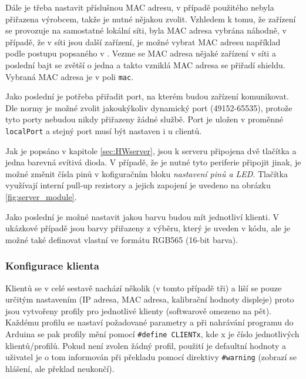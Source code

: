 Dále je třeba nastavit příslušnou MAC adresu, v případě použitého nebyla přiřazena výrobcem, takže je nutné nějakou zvolit. Vzhledem k tomu, že zařízení se provozuje na samostatné lokální síti, byla MAC adresa vybrána náhodně, v případě, že v síti jsou další zařízení, je možné vybrat MAC adresu například podle postupu popsaného v \cite{vyberMAC}. Vezme se MAC adresa nějaké zařízení v síti a poslední bajt se zvětší o jedna a takto vzniklá MAC adresa se přiřadí shieldu.
Vybraná MAC adresa je v poli \texttt{mac}.

Jako poslední je potřeba přiřadit port, na kterém budou zařízení komunikovat. Dle normy \cite{norm_RFC6335} je možné zvolit jakoukýkoliv dynamický port (49152-65535), protože tyto porty nebudou nikdy přiřazeny žádné službě. Port je uložen v proměnné \texttt{localPort} a stejný port musí být nastaven i u clientů.


Jak je popsáno v kapitole \ref{sec:HWserver}, jsou k serveru připojena dvě tlačítka a jedna barevná svítivá dioda. V případě, že je nutné tyto periferie připojit jinak, je možné změnit čísla pinů v kofiguračním bloku \textit{nastavení pinů a LED}. Tlačítka využívají interní pull-up rezistory a jejich zapojení je uvedeno na obrázku \ref{fig:server_module}.


Jako poslední je možné nastavit jakou barvu budou mít jednotliví klienti. V ukázkové případě jsou barvy přiřazeny z výběru, který je uveden v kódu, ale je možné také definovat vlastní ve formátu RGB565 (16-bit barva).


\subsubsection{Konfigurace klienta}
\label{sec:client-nastaveni}
Klientů se v celé sestavě nachází několik (v tomto případě tři) a liší se pouze určitým nastavením (IP adresa, MAC adresa, kalibrační hodnoty displeje) proto jsou vytvořeny profily pro jednotlivé klienty (softwarově omezeno na pět). Každému profilu se nastaví požadované parametry a při nahrávání programu do Arduina se pak profily mění pomocí \texttt{\#define CLIENTx}, kde x je číslo jednotlivých klientů/profilů. Pokud není zvolen žádný profil, použití je defaultní hodnoty a uživatel je o tom informován při překladu pomocí direktivy \texttt{\#warning} (zobrazí se hlášení, ale překlad neukončí).


